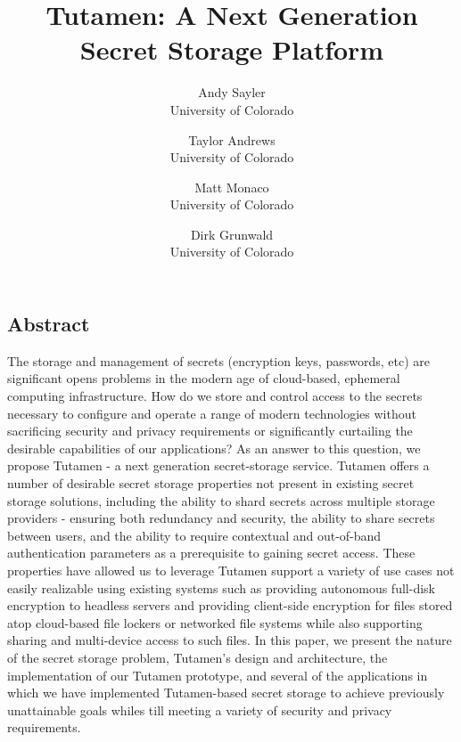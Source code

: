 \documentclass[letterpaper,twocolumn,10pt]{article}
\begin{document}
\date{}

\title{\Large \bf Tutamen: A Next Generation Secret Storage Platform}

\author{
{\rm Andy Sayler}\\
University of Colorado
\and
{\rm Taylor Andrews}\\
University of Colorado
\and
{\rm Matt Monaco}\\
University of Colorado
\and
{\rm Dirk Grunwald}\\
University of Colorado
} %

\maketitle


\subsection*{Abstract}

The storage and management of secrets (encryption keys, passwords,
etc) are significant opens problems in the modern age of cloud-based,
ephemeral computing infrastructure. How do we store and control access
to the secrets necessary to configure and operate a range of modern
technologies without sacrificing security and privacy requirements or
significantly curtailing the desirable capabilities of our
applications? As an answer to this question, we propose Tutamen - a
next generation secret-storage service. Tutamen offers a number of
desirable secret storage properties not present in existing secret
storage solutions, including the ability to shard secrets across
multiple storage providers - ensuring both redundancy and security,
the ability to share secrets between users, and the ability to require
contextual and out-of-band authentication parameters as a prerequisite
to gaining secret access. These properties have allowed us to leverage
Tutamen support a variety of use cases not easily realizable using
existing systems such as providing autonomous full-disk encryption to
headless servers and providing client-side encryption for files stored
atop cloud-based file lockers or networked file systems while also
supporting sharing and multi-device access to such files. In this
paper, we present the nature of the secret storage problem, Tutamen's
design and architecture, the implementation of our Tutamen prototype,
and several of the applications in which we have implemented
Tutamen-based secret storage to achieve previously unattainable goals
whiles till meeting a variety of security and privacy requirements.
\end{document}
